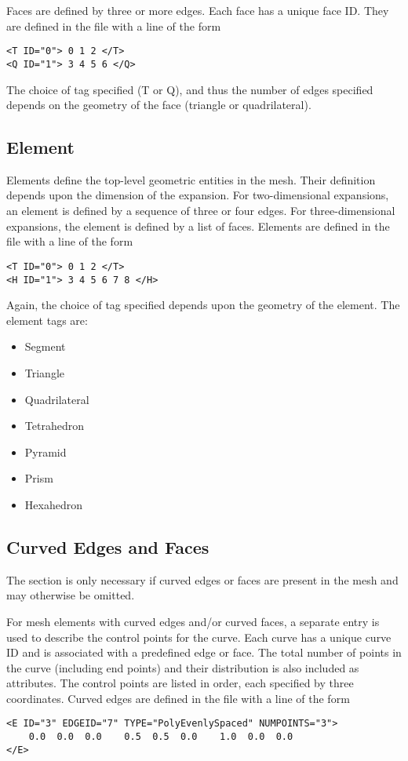 Faces are defined by three or more edges. Each face has a unique face ID. They
are defined in the file with a line of the form
\begin{lstlisting}[style=XMLStyle]
<T ID="0"> 0 1 2 </T>
<Q ID="1"> 3 4 5 6 </Q>
\end{lstlisting}
The choice of tag specified (T or Q), and thus the number of edges specified depends on the geometry of the face (triangle or quadrilateral).


\subsection{Element}
Elements define the top-level geometric entities in the mesh. Their definition depends upon the dimension of the expansion. For two-dimensional expansions, an element is defined by a sequence of three or four edges. For three-dimensional expansions, the element is defined by a list of faces. Elements are defined in the file with a line of the form
\begin{lstlisting}[style=XMLStyle]
<T ID="0"> 0 1 2 </T>
<H ID="1"> 3 4 5 6 7 8 </H>
\end{lstlisting}
Again, the choice of tag specified depends upon the geometry of the element. The element tags are:

\begin{itemize}
    \item {} Segment
    \item {} Triangle
    \item {} Quadrilateral
    \item {} Tetrahedron
    \item {} Pyramid
    \item {} Prism
    \item {} Hexahedron
\end{itemize}


\subsection{Curved Edges and Faces}
\begin{tipbox}
    The  section is only necessary if curved edges or faces are
    present in the mesh and may otherwise be omitted.
\end{tipbox}

For mesh elements with curved edges and/or curved faces, a separate entry is used to describe the control points for the curve. Each curve has a unique curve ID and is associated with a predefined edge or face. The total number of points in the curve (including end points) and their distribution is also included as attributes. The control points are listed in order, each specified by three coordinates. Curved edges are defined in the file with a line of the form
\begin{lstlisting}[style=XMLStyle]
<E ID="3" EDGEID="7" TYPE="PolyEvenlySpaced" NUMPOINTS="3">
    0.0  0.0  0.0    0.5  0.5  0.0    1.0  0.0  0.0
</E>
\end{lstlisting}


